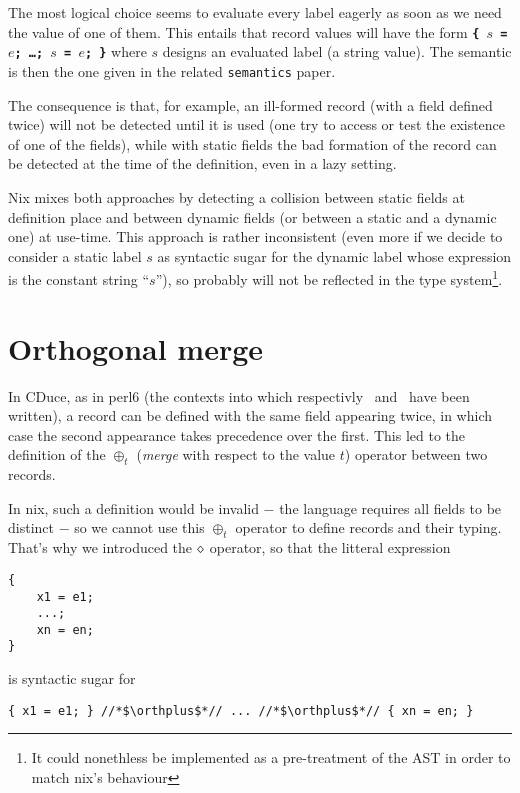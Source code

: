 The most logical choice seems to evaluate every label eagerly as soon as we
need the value of one of them. This entails that record values will have the
form \texttt{\bfseries \{ $s$ = $e$; \ldots{}; $s$ = $e$; \}} where $s$ designs
an evaluated label (a string value). The semantic is then the one given in the
related \texttt{semantics} paper.

The consequence is that, for example, an ill-formed record (with a field
defined twice) will not be detected until it is used (one try to access or test
the existence of one of the fields), while with static fields the bad formation
of the record can be detected at the time of the definition, even in a lazy
setting.

Nix mixes both approaches by detecting a collision between static fields at
definition place and between dynamic fields (or between a static and a dynamic
one) at use-time. This approach is rather inconsistent (even more if we decide
to consider a static label $s$ as syntactic sugar for the dynamic label whose
expression is the constant string ``$s$''), so probably will not be reflected in
the type system\footnote{It could nonethless be implemented as a pre-treatment
of the AST in order to match nix's behaviour}.

\section{Orthogonal merge}

In CDuce, as in perl6 (the contexts into which respectivly~\cite{Fri04}
and~\cite{Cas15} have been written), a record can be defined with the same field
appearing twice, in which case the second appearance takes precedence over the
first. This led to the definition of the $\oplus_t$ (\emph{merge} with
respect to the value $t$) operator between two records.

In nix, such a definition would be invalid − the language requires all
fields to be distinct − so we cannot use this $\oplus_t$ operator to
define records and their typing. That's why we introduced the $\diamond$
operator, so that the litteral expression

\begin{lstlisting}
{
    x1 = e1;
    ...;
    xn = en;
}
\end{lstlisting}

is syntactic sugar for

\begin{lstlisting}
{ x1 = e1; } //*$\orthplus$*// ... //*$\orthplus$*// { xn = en; }
\end{lstlisting}

